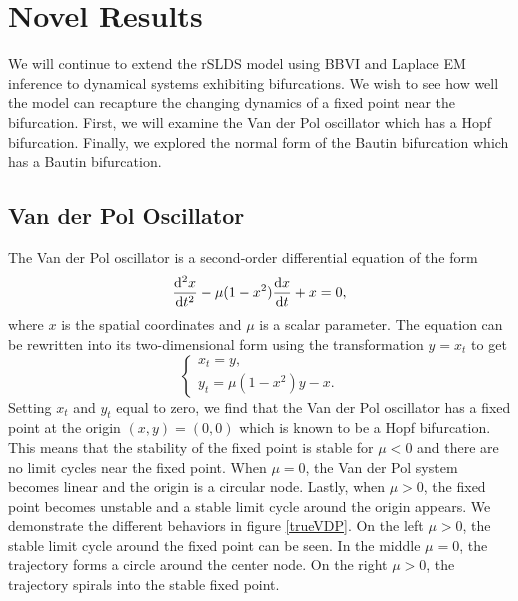 \section{Novel Results}
We will continue to extend the rSLDS model using BBVI and Laplace EM inference to dynamical systems exhibiting bifurcations. We wish to see how well the model can recapture the changing dynamics of a fixed point near the bifurcation. First, we will examine the Van der Pol oscillator which has a Hopf bifurcation. Finally, we explored the normal form of the Bautin bifurcation which has a Bautin bifurcation.  

\subsection{Van der Pol Oscillator}
The Van der Pol oscillator is a second-order differential equation of the form
\begin{equation}
    \frac{{\mathrm{d}}^2 x}{{\mathrm{d}} t^2} - \mu(1 - x^2)\frac{{\mathrm{d}} x}{{\mathrm{d}} t} + x = 0,
\end{equation}
where $x$ is the spatial coordinates and $\mu$ is a scalar parameter. The equation can be rewritten into its two-dimensional form using the transformation $y = x_t$ to get
\begin{equation}
    \begin{cases}
        x_t = y,\\
        y_t = \mu(1-x^2)y - x.
    \end{cases}
\end{equation}
Setting $x_t$ and $y_t$ equal to zero, we find that the Van der Pol oscillator has a fixed point at the origin $(x,y) = (0,0)$ which is known to be a Hopf bifurcation. This means that the stability of the fixed point is stable for $\mu < 0$ and there are no limit cycles near the fixed point. When $\mu = 0$, the Van der Pol system becomes linear and the origin is a circular node. Lastly, when $\mu > 0$, the fixed point becomes unstable and a stable limit cycle around the origin appears. We demonstrate the different behaviors in figure \ref{trueVDP}. On the left $\mu > 0$, the stable limit cycle around the fixed point can be seen. In the middle $\mu =0$, the trajectory forms a circle around the center node. On the right $\mu > 0$, the trajectory spirals into the stable fixed point. 


